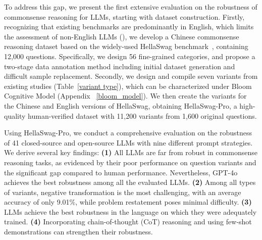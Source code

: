 
To address this gap, we present the first extensive evaluation on the robustness of commonsense reasoning for LLMs, starting with dataset construction. 
Firstly, recognizing that existing benchmarks are predominantly in English, which limits the assessment of non-English LLMs (\citealp{davis2023benchmarks}), we develop a Chinese commonsense reasoning dataset based on the widely-used HellaSwag benchmark~\cite{zellers2019hellaswag}, containing 12,000 questions. Specifically, we design 56 fine-grained categories, and propose a two-stage data annotation method including initial dataset generation and difficult sample replacement. 
Secondly, we design and compile seven variants from existing studies (\cf Table~\ref{variant type}), which can be characterized under Bloom Cognitive Model (\cf Appendix ~\ref{bloom_model}).
We then create the variants for the Chinese and English versions of HellaSwag, obtaining HellaSwag-Pro, a high-quality human-verified dataset with 11,200 variants from 1,600 original questions. 

Using HellaSwag-Pro, we conduct a comprehensive evaluation on the robustness of 41 closed-source and open-source LLMs with nine different prompt strategies. 
We derive several key findings:
\textbf{(1)} 
All LLMs are far from robust in commonsense reasoning tasks, as evidenced by their poor performance on question variants and the significant gap compared to human performance. 
Nevertheless, GPT-4o achieves the best robustness among all the evaluated LLMs. 
\textbf{(2)} Among all types of variants, negative transformation is the most challenging, with an average accuracy of only 9.01\%, while problem restatement poses minimal difficulty. 
\textbf{(3)} LLMs achieve the best robustness in the language on which they were adequately trained. 
\textbf{(4)} Incorporating chain-of-thought (CoT) reasoning and using few-shot demonstrations can strengthen their robustness. 

